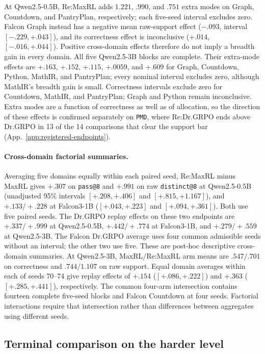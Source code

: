 \documentclass{article}
\newcommand{\1}{\mathbf 1}
\newcommand{\pmd}{\texttt{PMD}}
\theoremstyle{remark}
\theoremstyle{definition}
\theoremstyle{plain}
\begin{document}
At Qwen2.5-0.5B, Re:MaxRL adds $1.221$, $.990$, and $.751$ extra modes
on Graph, Countdown, and PantryPlan, respectively; each five-seed interval
excludes zero. Falcon Graph instead has a negative mean raw-support effect
($-.093$, interval $[-.229,+.043]$), and its correctness effect is inconclusive
($+.014$, $[-.016,+.044]$). Positive cross-domain effects therefore do not
imply a breadth gain in every domain. All five Qwen2.5-3B blocks are complete. Their extra-mode effects are
$+.163$, $+.152$, $+.115$, $+.0059$, and $+.609$ for Graph, Countdown,
Python, MathIR, and PantryPlan; every nominal interval excludes zero,
although MathIR's breadth gain is small. Correctness intervals exclude zero
for Countdown, MathIR, and PantryPlan; Graph and Python remain inconclusive.
Extra modes are a function of correctness as well as of allocation, so the
direction of these effects is confirmed separately on \pmd{}, where
Re:Dr.GRPO ends above Dr.GRPO in 13 of the 14 comparisons that clear the
support bar (App.~\ref{app:registered-endpoints}).

\paragraph{Cross-domain factorial summaries.}
\label{app:factorial-numerical-detail}
Averaging five domains equally within each paired seed, Re:MaxRL minus
MaxRL gives $+.307$ on \texttt{pass@8} and $+.991$ on raw
\texttt{distinct@8} at Qwen2.5-0.5B (unadjusted 95\% intervals
$[+.208,+.406]$ and $[+.815,+1.167]$), and $+.133/+.228$ at Falcon3-1B
($[+.043,+.223]$ and $[+.094,+.361]$). Both use five paired seeds.
The Dr.GRPO replay effects on these two endpoints are $+.337/+.999$ at
Qwen2.5-0.5B, $+.442/+.774$ at Falcon3-1B, and $+.279/+.559$ at
Qwen2.5-3B. The Falcon Dr.GRPO average uses four common admissible seeds
without an interval; the other two use five. These are post-hoc descriptive
cross-domain summaries. At Qwen2.5-3B, MaxRL/Re:MaxRL arm means are
$.547/.701$ on correctness and $.744/1.107$ on raw support. Equal domain
averages within each of seeds 70--74 give replay effects of $+.154$
($[+.086,+.222]$) and $+.363$ ($[+.285,+.441]$), respectively.
The common four-arm intersection contains fourteen complete five-seed
blocks and Falcon Countdown
at four seeds. Factorial interactions require that intersection rather than
differences between aggregates using different seeds.


\subsection{Terminal comparison on the harder level}
\label{app:level2-interim}
\end{document}
